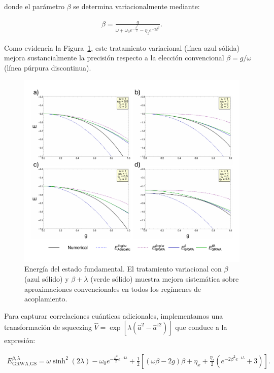 \documentclass[onecolumn,notitlepage,letterpaper,aps,pra,12pt]{article}
\numberwithin{equation}{section}
\begin{document}
donde el parámetro $\beta$ se determina variacionalmente mediante:

\begin{gather}
\beta = \frac{g}{\omega + \omega_{0} e^{-\frac{\beta^{2}}{2}} - \eta_{z} e^{-2\beta^{2}}}.
\end{gather}

Como evidencia la Figura~\ref{fig:Ground State}, este tratamiento variacional (línea azul sólida) mejora sustancialmente la precisión respecto a la elección convencional $\beta = g/\omega$ (línea púrpura discontinua).

\begin{figure}[H]
    \centering
    \includegraphics[width=0.95\linewidth]{Images APS v1/Estado Base.pdf}
    \caption{Energía del estado fundamental. El tratamiento variacional con $\beta$ (azul sólido) y $\beta + \lambda$ (verde sólido) muestra mejora sistemática sobre aproximaciones convencionales en todos los regímenes de acoplamiento.}
    \label{fig:Ground State}
\end{figure}

Para capturar correlaciones cuánticas adicionales, implementamos una transformación de squeezing $\hat{V} = \exp\left[{\lambda\left(\hat{a}^{2} - \hat{a}^{\dagger2}\right)}\right]$ que conduce a la expresión:

\begin{gather}
E_{\text{GRWA,GS}}^{\beta,\lambda} = \omega \sinh^{2}(2\lambda) - \omega_{0} e^{-\frac{\beta^{2}}{2} e^{-4\lambda}} + \frac{1}{2}\left[ (\omega\beta -2g)\beta + \eta_{x} + \frac{\eta_{z}}{2}\left( e^{-2\beta^{2}e^{-4\lambda}} +3 \right) \right].
\end{gather}
\end{document}
